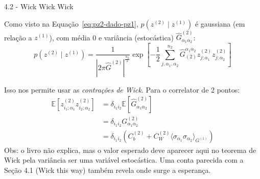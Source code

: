 \documentclass{beamer}
\begin{document}
\begin{frame}{4.2 - Wick Wick Wick}
    \small

    Como visto na Equação~\eqref{eq:pz2-dado-pz1}, $p(z^{(2)}\mid z^{(1)})$ é gaussiana (em relação a $z^{(1)}$), com média 0 e variância (estocástica) $\widehat{G}^{(2)}_{\alpha_1\alpha_2}$:
    \begin{equation*}
        p(z^{(2)} \mid z^{(1)}) = \frac{1}{|2\pi \widehat G^{(2)}|^{\frac{n_2}{2}}} \exp \left[- \frac{1}{2} \sum_{j, \alpha_1, \alpha_2}^{n_2} \widehat G_{(2)}^{\alpha_1 \alpha_2} z^{(2)}_{j; \alpha_1} z^{(2)}_{j; \alpha_2}\right]
    \end{equation*}

    \pause Isso nos permite usar as \textit{contrações de Wick}. \pause Para o correlator de 2 pontos:
    \begin{align*}
        \mathbb E \left[
            z^{(2)}_{i_1;\alpha_1}z^{(2)}_{i_2;\alpha_2}
        \right]
        &= \delta_{i_1i_2} \mathbb E [\widehat G^{(2)}_{\alpha_1 \alpha_2}] \\
        &= \delta_{i_1i_2} G^{(2)}_{\alpha_1 \alpha_2} \\
        &= \delta_{i_1i_2} \left(C^{(2)}_b + C^{(2)}_W \langle \sigma_{\alpha_1} \sigma_{\alpha_2} \rangle_{G^{(1)}} \right)
    \end{align*}
    \pause 
    \scriptsize
    Obs: o livro não explica, mas o valor esperado deve aparecer aqui no teorema de Wick pela variância ser uma variável estocástica. Uma conta parecida com a Seção 4.1 (Wick this way) também revela onde surge a esperança.

\end{frame}
\end{document}
